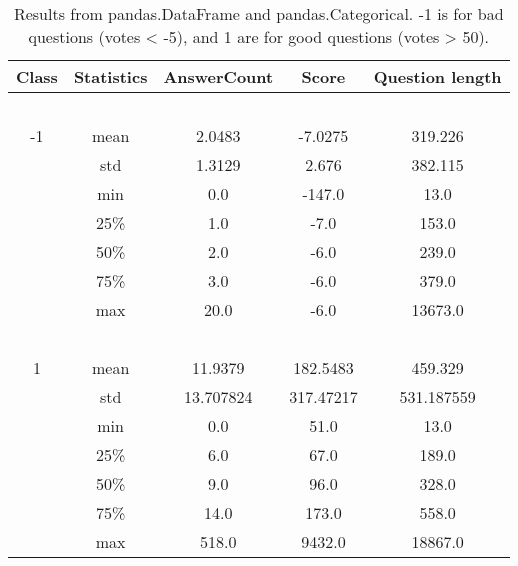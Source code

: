 \clearpage
\begin{table}[h]%
	\centering
	\begin{tabular}{| c | c | c | c |c |}
		\hline
		Class 		& Statistics	& AnswerCount		& Score 		& Question length 	\\ \hline
		~ 			& ~ 			& ~  				& ~ 			& ~					\\ \hline
		-1 			& mean 		& 2.0483 			& -7.0275 		& 319.226 		\\ \hline
		~ 			& std 		& 1.3129 			& 2.676 		& 382.115  		\\ \hline
		~ 			& min 		& 0.0 				& -147.0 		& 13.0  		\\ \hline
		~ 			& 25\% 		& 1.0 				& -7.0 			& 153.0 		\\ \hline
		~ 			& 50\% 		& 2.0 				& -6.0 			& 239.0  		\\ \hline
		~ 			& 75\% 		& 3.0 				& -6.0 			& 379.0  		\\ \hline
		~ 			& max 		& 20.0 				& -6.0 			& 13673.0  		\\ \hline
		~ 			& ~ 		& ~  				& ~ 			& ~				\\ \hline
		1 			& mean 		& 11.9379 			& 182.5483 		& 459.329		\\ \hline
		~ 			& std 		& 13.707824			& 317.47217 	& 531.187559  		\\ \hline
		~ 			& min 		& 0.0 				& 51.0 			& 13.0  		\\ \hline
		~ 			& 25\% 		& 6.0 				& 67.0 			& 189.0 		\\ \hline
		~ 			& 50\% 		& 9.0 				& 96.0 			& 328.0  		\\ \hline
		~ 			& 75\% 		& 14.0 				& 173.0 		& 558.0  		\\ \hline
		~ 			& max 		& 518.0 			& 9432.0 		& 18867.0  		\\ \hline
		
	\end{tabular}
	\caption{Results from pandas.DataFrame and pandas.Categorical. -1 is for bad questions (votes < -5), 
		and 1 are for good questions (votes > 50).}
	\label{tab:pandas_categorical}
\end{table}
